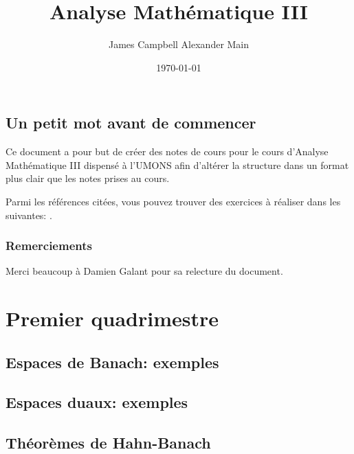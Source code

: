 \documentclass[a4paper, 12pt]{book}
\title{Analyse Mathématique III}
\author{James Campbell Alexander Main}
\date{\today}
\theoremstyle{definition} \newtheorem{df}{D\'{e}finition}[chapter]
\theoremstyle{definition} \newtheorem{ex}[df]{Exemple}
\theoremstyle{definition} \newtheorem{thm}[df]{Th\'{e}or\`{e}me}
\theoremstyle{definition} \newtheorem{cor}[df]{Corollaire}
\theoremstyle{definition} \newtheorem{lem}[df]{Lemme}
\theoremstyle{definition} \newtheorem{prop}[df]{Proposition}
\theoremstyle{definition} \newtheorem{rem}[df]{Remarque}
\theoremstyle{definition} \newtheorem{exo}{Exercice}[chapter]
\begin{document}
\frontmatter

\maketitle

\tableofcontents
\chapter{Un petit mot avant de commencer}
Ce document a pour but de créer des notes de cours
pour le cours d'Analyse Mathématique III dispensé
à l'UMONS afin d'altérer la structure dans un format
plus clair que les notes prises au cours.

Parmi les références citées, vous pouvez trouver des exercices
à réaliser dans les suivantes: \cite{hb:exo1}.

\section*{Remerciements}

Merci beaucoup à Damien Galant pour sa relecture du document.

\mainmatter
\part{Premier quadrimestre}
\chapter{Espaces de Banach: exemples}


\chapter{Espaces duaux: exemples}



\chapter{Théorèmes de Hahn-Banach}



\appendix




\end{document}
